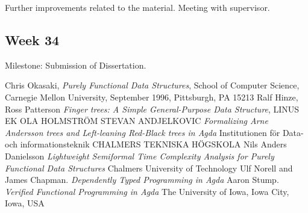 \documentclass[12pt]{article}
\begin{document}
Further improvements related to the material. Meeting with supervisor.

\subsection*{Week 34}

Milestone: Submission of Dissertation.

\begin{thebibliography}{9}
  Chris Okasaki,
  \emph{Purely Functional Data Structures},
  School of Computer Science,
  Carnegie Mellon University,
  September 1996,
  Pittsburgh, PA 15213
  Ralf Hinze, Ross Patterson
  \emph{Finger trees: A Simple General-Purpose Data Structure},
  LINUS EK
  OLA HOLMSTRÖM
  STEVAN ANDJELKOVIC
  \emph{Formalizing Arne Andersson trees and Left-leaning Red-Black trees in Agda}
  Institutionen för Data- och informationsteknik
  CHALMERS TEKNISKA HÖGSKOLA
Nils Anders Danielsson
  \emph{Lightweight Semiformal Time Complexity Analysis for
Purely Functional Data Structures}
Chalmers University of Technology
  Ulf Norell and James Chapman.
  \emph{Dependently Typed Programming in Agda}
  Aaron Stump.
  \emph{Verified Functional Programming in Agda}
  The University of Iowa,
  Iowa City, Iowa, USA

\end{thebibliography}
\end{document}
